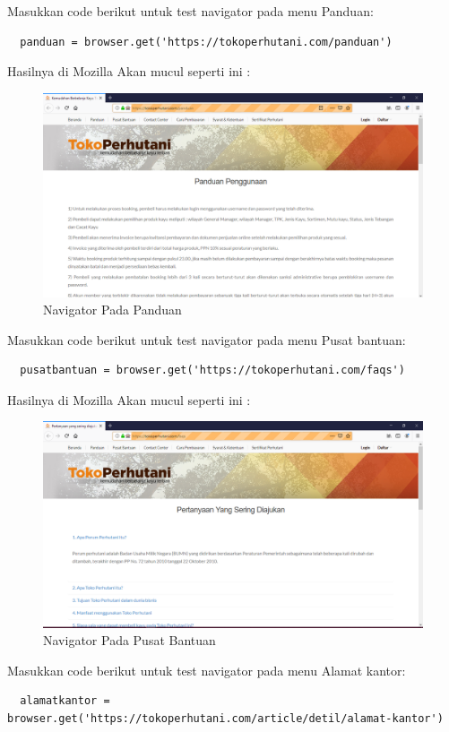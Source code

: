 Masukkan code berikut untuk test navigator pada menu  Panduan:
\begin{verbatim}
  panduan = browser.get('https://tokoperhutani.com/panduan')
\end{verbatim}

Hasilnya  di Mozilla Akan mucul seperti ini :
\begin{figure}[h]
\centering
\includegraphics[scale=0.3]{figures/1hasil.PNG}
\caption{Navigator Pada Panduan}
\end{figure}

Masukkan code berikut untuk test navigator pada menu  Pusat bantuan:
\begin{verbatim}
  pusatbantuan = browser.get('https://tokoperhutani.com/faqs')
\end{verbatim}

Hasilnya  di Mozilla Akan mucul seperti ini :
\begin{figure}[h]
\centering
\includegraphics[scale=0.3]{figures/2hasil.PNG}
\caption{Navigator Pada Pusat Bantuan}
\end{figure}

Masukkan code berikut untuk test navigator pada menu  Alamat kantor:
\begin{verbatim}
  alamatkantor = browser.get('https://tokoperhutani.com/article/detil/alamat-kantor')
\end{verbatim}

